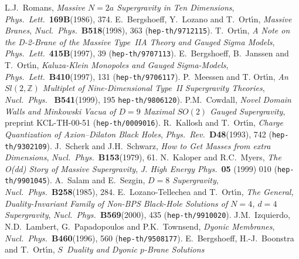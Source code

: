 \documentclass[12pt,a4paper]{article}
\begin{document}
\begin{thebibliography}{50}

 L.J.~Romans,
        {\sl Massive $N=2a$ Supergravity in Ten Dimensions},
        {\it Phys.~Lett.}~{\bf 169B}(1986), 374.
%
 E.~Bergshoeff, Y.~Lozano and T.~Ort\'{\i}n,
        {\sl Massive Branes},
        {\it Nucl.~Phys.}~{\bf B518}(1998), 363 ({\tt hep-th/9712115}). 
%
 T.~Ort\'{\i}n,
        {\sl A Note on the D-2-Brane of the Massive 
             Type~IIA Theory and Gauged Sigma Models},
      {\it Phys.~Lett.}~{\bf 415B}(1997), 39 ({\tt hep-th/9707113}).
%
 E.~Bergshoeff, B.~Janssen and T.~Ort\'{\i}n,
        {\sl Kaluza-Klein Monopoles and  Gauged Sigma-Models},
        {\it Phys.~Lett.}~{\bf B410}(1997), 131 ({\tt hep-th/9706117}).
%
 P.~Meessen and T. Ort\'{\i}n,
        {\sl An $Sl(2,\mathbb{Z})$ Multiplet of Nine-Dimensional 
        Type~II Supergravity Theories},
        {\it Nucl.~Phys.}~ {\bf B541}(1999), 195 {\tt hep-th/9806120}).
%
 P.M.~Cowdall, 
        {\sl Novel Domain Walls and Minkowski Vacua of $D=9$
             Maximal $SO(2)$ Gauged Supergravity},
        preprint KCL-TH-00-51 ({\tt hep-th/0009016}).
%
 R.~Kallosh and T.~Ort\'{\i}n,
     {\sl Charge Quantization of Axion--Dilaton Black Holes},
     {\it Phys.~Rev.}~{\bf D48}(1993), 742 ({\tt hep-th/9302109}).
%
 J.~Scherk and J.H.~Schwarz,
        {\sl How to Get Masses from extra Dimensions},
        {\it Nucl.~Phys.}~{\bf B153}(1979), 61.
%
 N.~Kaloper and R.C.~Myers,
        {\sl The O(dd) Story of Massive Supergravity},
  {\it J. High Energy Phys.}~{\bf 05} (1999) 010 ({\tt hep-th/9901045}).
%
 A.~Salam and E.~Sezgin,
        {\sl $D=8$ Supergravity},
        {\it Nucl.~Phys.}~{\bf B258}(1985), 284. 
%
 E.~Lozano-Tellechea and T.~Ort\'{\i}n,
        {\sl The General, Duality-Invariant Family of Non-BPS
              Black-Hole Solutions of  $N=4$, $d=4$ Supergravity},
        {\it Nucl.~Phys.}~{\bf B569}(2000), 435 ({\tt hep-th/9910020}).
%
 J.M.~Izquierdo, N.D.~Lambert, G.~Papadopoulos and 
                  P.K.~Townsend,
        {\sl Dyonic Membranes},
        {\it Nucl.~Phys.}~{\bf B460}(1996), 560 ({\tt hep-th/9508177}).
%
 E.~Bergshoeff, H.-J.~Boonstra and T.~Ort\'{\i}n,
        {\sl $S$~Duality and Dyonic $p$-Brane Solutions
}
\end{thebibliography}
\end{document}
